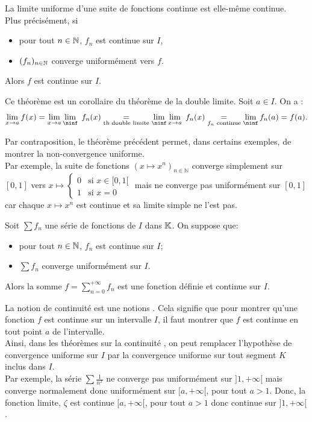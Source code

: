\documentclass{book}
\newcommand{\fn}{(f_n)_{n\in \N   }}
\newcommand{\Sfn}{\sum f_n}
\begin{document}
\begin{Theoreme}
La limite uniforme d'une suite de fonctions continue est elle-même continue.\\
Plus précisément, si
\begin{itemize}
\item
  pour tout $n\in \mathbb{N}   $, $f_n$ est continue sur $I$,
\item
  $\fn$ converge uniformément vers $f$.
\end{itemize}
Alors $f$ est continue sur $I$.
\end{Theoreme}
\begin{Demonstration}
Ce théorème est un corollaire du théorème de la double limite. Soit $a\in I$. On a :
$$\lim_{x\to a} f(x)=\lim_{x\to a}\lim_\ninf \; f_n(x) \underset{\text{th double limite}}{=}\lim_\ninf \lim_{x\to a} \; f_n(x)\underset{f_n \text{ continue}}{=}\lim_\ninf f_n(a)= f(a).  $$
\end{Demonstration}
%
\begin{Remarque}
Par contraposition, le théorème précédent permet, dans certains exemples, de montrer la non-convergence uniforme. \\ 
Par exemple, la suite de fonctions $(x\mapsto x^n)_{n\in \mathbb{N}}$ converge simplement sur $[0,1]$ vers  $x \mapsto \begin{cases}0&{\text{si }}x\in[0,1[\\1&{\text{si } x=0}\end{cases}$ mais ne converge pas uniformément  sur $[0,1]$ car chaque $x\mapsto x^n$ est continue et sa limite simple ne l'est pas.
\end{Remarque}
\begin{Theoreme}
Soit $\Sfn$ une série de fonctions de $I$ dans $\mathbb{K}  $.
On suppose que:
\begin{itemize}
\item
  pour tout $n\in \mathbb{N}   $, $f_n$ est continue sur $I$;
\item
  $\Sfn$ converge uniformément sur $I$.
\end{itemize}
Alors la somme $f = \sum _{n=0}^{+\infty } f_n$ est une fonction définie et continue sur $I$.
\end{Theoreme}
\begin{Remarque}La notion de continuité est une notions . Cela signifie que pour montrer qu'une fonction $f$ est continue sur un intervalle $I$, il faut montrer que $f$ est continue en tout point $a$ de l'intervalle.\\
Ainsi, dans les théorèmes sur la continuité , on peut remplacer l'hypothèse de convergence uniforme sur $I$ par la convergence uniforme sur tout segment $K$ inclus dans $I$.\\
Par exemple, la série $\sum\frac {1}{n^{x}}$ ne converge pas uniformément sur $]1,+\infty[$ mais converge normalement donc uniformément sur  $[a,+\infty[$, pour tout $a>1$. Donc, la fonction limite,   $\zeta$ est continue $[a,+\infty[$, pour tout $a>1$ donc continue sur  $]1,+\infty[$.
\end{Remarque}
\end{document}
